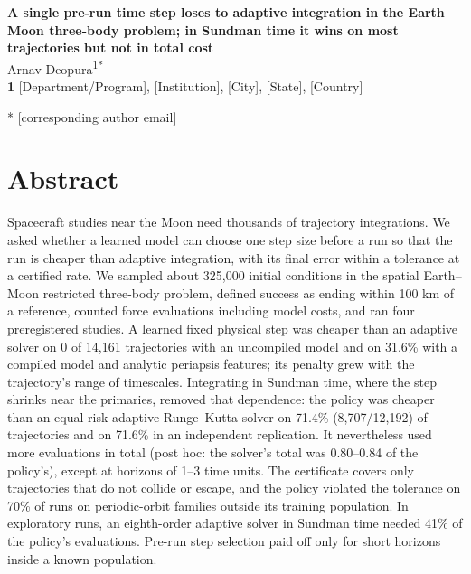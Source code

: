 \documentclass[10pt,letterpaper]{article}
\begin{document}
\vspace*{0.2in}

\begin{flushleft}
{\Large
\textbf{A single pre-run time step loses to adaptive integration in the Earth--Moon three-body problem; in Sundman time it wins on most trajectories but not in total cost}
}
\newline
\\
Arnav Deopura\textsuperscript{1*}
\\
\bigskip
\textbf{1} [Department/Program], [Institution], [City], [State], [Country]
\\
\bigskip

* [corresponding author email]

\end{flushleft}

\section*{Abstract}
Spacecraft studies near the Moon need thousands of trajectory integrations. We asked whether a learned model can choose one step size before a run so that the run is cheaper than adaptive integration, with its final error within a tolerance at a certified rate. We sampled about 325,000 initial conditions in the spatial Earth--Moon restricted three-body problem, defined success as ending within 100 km of a reference, counted force evaluations including model costs, and ran four preregistered studies. A learned fixed physical step was cheaper than an adaptive solver on 0 of 14,161 trajectories with an uncompiled model and on 31.6\% with a compiled model and analytic periapsis features; its penalty grew with the trajectory's range of timescales. Integrating in Sundman time, where the step shrinks near the primaries, removed that dependence: the policy was cheaper than an equal-risk adaptive Runge--Kutta solver on 71.4\% (8,707/12,192) of trajectories and on 71.6\% in an independent replication. It nevertheless used more evaluations in total (post hoc: the solver's total was 0.80--0.84 of the policy's), except at horizons of 1--3 time units. The certificate covers only trajectories that do not collide or escape, and the policy violated the tolerance on 70\% of runs on periodic-orbit families outside its training population. In exploratory runs, an eighth-order adaptive solver in Sundman time needed 41\% of the policy's evaluations. Pre-run step selection paid off only for short horizons inside a known population.
\end{document}
